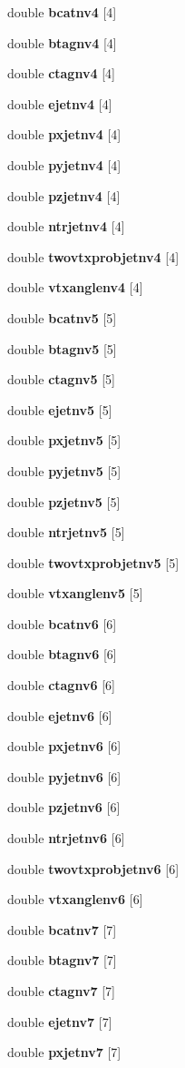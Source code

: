 \begin{DoxyCompactItemize}
\item 
double {\bf bcatnv4} [4]
\item 
double {\bf btagnv4} [4]
\item 
double {\bf ctagnv4} [4]
\item 
double {\bf ejetnv4} [4]
\item 
double {\bf pxjetnv4} [4]
\item 
double {\bf pyjetnv4} [4]
\item 
double {\bf pzjetnv4} [4]
\item 
double {\bf ntrjetnv4} [4]
\item 
double {\bf twovtxprobjetnv4} [4]
\item 
double {\bf vtxanglenv4} [4]
\item 
double {\bf bcatnv5} [5]
\item 
double {\bf btagnv5} [5]
\item 
double {\bf ctagnv5} [5]
\item 
double {\bf ejetnv5} [5]
\item 
double {\bf pxjetnv5} [5]
\item 
double {\bf pyjetnv5} [5]
\item 
double {\bf pzjetnv5} [5]
\item 
double {\bf ntrjetnv5} [5]
\item 
double {\bf twovtxprobjetnv5} [5]
\item 
double {\bf vtxanglenv5} [5]
\item 
double {\bf bcatnv6} [6]
\item 
double {\bf btagnv6} [6]
\item 
double {\bf ctagnv6} [6]
\item 
double {\bf ejetnv6} [6]
\item 
double {\bf pxjetnv6} [6]
\item 
double {\bf pyjetnv6} [6]
\item 
double {\bf pzjetnv6} [6]
\item 
double {\bf ntrjetnv6} [6]
\item 
double {\bf twovtxprobjetnv6} [6]
\item 
double {\bf vtxanglenv6} [6]
\item 
double {\bf bcatnv7} [7]
\item 
double {\bf btagnv7} [7]
\item 
double {\bf ctagnv7} [7]
\item 
double {\bf ejetnv7} [7]
\item 
double {\bf pxjetnv7} [7]
\item 

\end{DoxyCompactItemize}

